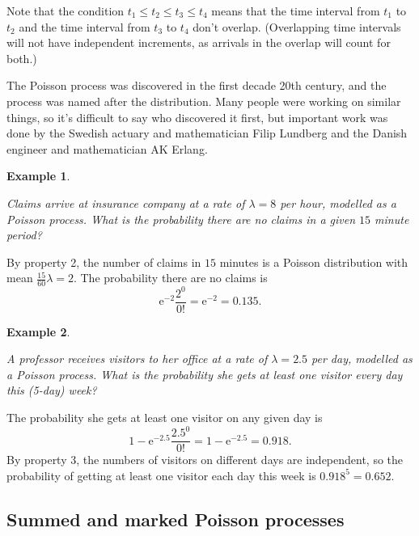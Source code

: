 \documentclass[
  a4paper,
]{article}
\theoremstyle{definition}
\theoremstyle{definition}
\newtheorem{example}{Example}[section]
\theoremstyle{definition}
\theoremstyle{remark}
\begin{document}
Note that the condition \(t_1 \leq t_2 \leq t_3 \leq t_4\) means that the time interval from \(t_1\) to \(t_2\) and the time interval from \(t_3\) to \(t_4\) don't overlap. (Overlapping time intervals will not have independent increments, as arrivals in the overlap will count for both.)

The Poisson process was discovered in the first decade 20th century, and the process was named after the distribution. Many people were working on similar things, so it's difficult to say who discovered it first, but important work was done by the Swedish actuary and mathematician Filip Lundberg and the Danish engineer and mathematician AK Erlang.

\begin{example}
\protect\hypertarget{exm:poisson-ex-1}{}\label{exm:poisson-ex-1}

\emph{Claims arrive at insurance company at a rate of \(\lambda = 8\) per hour, modelled as a Poisson process. What is the probability there are no claims in a given \(15\) minute period?}

By property 2, the number of claims in \(15\) minutes is a Poisson distribution with mean \(\frac{15}{60}\lambda = 2\). The probability there are no claims is
\[ \mathrm{e}^{-2} \frac{2^0}{0!} = \mathrm{e}^{-2} = 0.135 . \]

\end{example}

\begin{example}
\protect\hypertarget{exm:poisson-ex-2}{}\label{exm:poisson-ex-2}

\emph{A professor receives visitors to her office at a rate of \(\lambda = 2.5\) per day, modelled as a Poisson process. What is the probability she gets at least one visitor every day this (5-day) week?}

The probability she gets at least one visitor on any given day is
\[ 1 - \mathrm{e}^{-2.5} \frac{2.5^0}{0!} = 1 - \mathrm{e}^{-2.5} = 0.918.   \]
By property 3, the numbers of visitors on different days are independent, so the probability of getting at least one visitor each day this week is
\(0.918^5 = 0.652\).

\end{example}

\hypertarget{summed-marked}{%
\subsection{Summed and marked Poisson processes}\label{summed-marked}}
\end{document}
